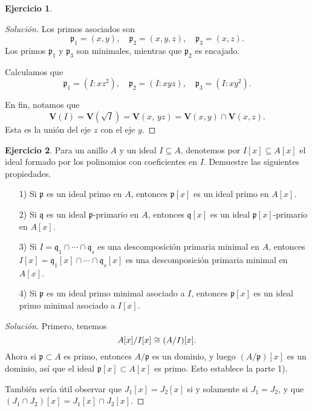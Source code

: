 \documentclass{article}
\theoremstyle{definition}
\newtheorem{ejerc}{Ejercicio}
\newenvironment{solucion}{\begin{proof}[Solución]}{\end{proof}}
\begin{document}
\begin{ejerc}
\begin{solucion}
    Los primos asociados son
    \[ \mathfrak{p}_1 = (x,y), \quad
       \mathfrak{p}_2 = (x,y,z), \quad
       \mathfrak{p}_3 = (x,z). \]
    Los primos $\mathfrak{p}_1$ y $\mathfrak{p}_3$ son minimales, mientras que
    $\mathfrak{p}_2$ es encajado.

    Calculamos que
    \[ \mathfrak{p}_1 = (I : xz^2), \quad
       \mathfrak{p}_2 = (I : xyz), \quad
       \mathfrak{p}_3 = (I : xy^2). \]

    En fin, notamos que
    \[ \mathbf{V} (I) = \mathbf{V} (\sqrt{I}) =
       \mathbf{V} (x, \, yz) = \mathbf{V} (x,y) \cap \mathbf{V} (x,z). \]
    Esta es la unión del eje $z$ con el eje $y$.
  \end{solucion}\fi
\end{ejerc}

\begin{ejerc}
  Para un anillo $A$ y un ideal $I \subseteq A$, denotemos por
  $I [x] \subseteq A [x]$ el ideal formado por los polinomios con coeficientes
  en $I$. Demuestre las siguientes propiedades.

  \begin{enumerate}
  \item[1)] Si $\mathfrak{p}$ es un ideal primo en $A$, entonces
    $\mathfrak{p}[x]$ es un ideal primo en $A [x]$.
  \item[2)] Si $\mathfrak{q}$ es un ideal $\mathfrak{p}$-primario en $A$,
    entonces $\mathfrak{q}[x]$ es un ideal $\mathfrak{p}[x]$-primario en
    $A [x]$.
  \item[3)] Si $I = \mathfrak{q}_1\cap\cdots\cap\mathfrak{q}_s$ es una
    descomposición primaria minimal en $A$, entonces
    $I [x] = \mathfrak{q}_1 [x]\cap\cdots\cap\mathfrak{q}_s [x]$ es una
    descomposición primaria minimal en $A [x]$.
  \item[4)] Si $\mathfrak{p}$ es un ideal primo minimal asociado a $I$, entonces
    $\mathfrak{p} [x]$ es un ideal primo minimal asociado a $I [x]$.
  \end{enumerate}

  \ifdefined\solutions\begin{solucion}
    Primero, tenemos
    $$A[x] / I [x] \cong (A/I) [x].$$
    Ahora si $\mathfrak{p} \subset A$ es primo, entonces $A/\mathfrak{p}$ es un
    dominio, y luego $(A/\mathfrak{p}) [x]$ es un dominio, así que el ideal
    $\mathfrak{p} [x] \subset A [x]$ es primo. Esto establece la parte 1).

    También sería útil observar que $J_1 [x] = J_2 [x]$ si y solamente si
    $J_1 = J_2$, y que $(J_1 \cap J_2) [x] = J_1 [x] \cap J_2 [x]$.


\end{solucion}
\end{ejerc}
\end{document}
